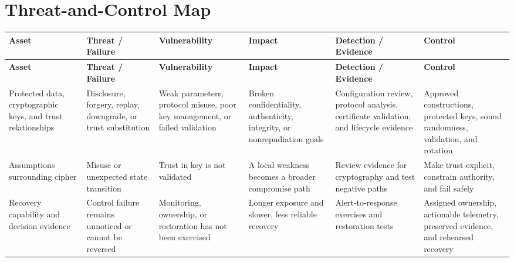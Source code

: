 \documentclass[11pt,letterpaper]{article}
\begin{document}
\section*{Threat-and-Control Map}
\begingroup\scriptsize\setlength{\tabcolsep}{2pt}
\begin{longtable}{>{\raggedright\arraybackslash}p{}>{\raggedright\arraybackslash}p{}>{\raggedright\arraybackslash}p{}>{\raggedright\arraybackslash}p{}>{\raggedright\arraybackslash}p{}>{\raggedright\arraybackslash}p{}}
\toprule\rowcolor{Navy}\color{white}\textbf{Asset} & \color{white}\textbf{Threat / Failure} & \color{white}\textbf{Vulnerability} & \color{white}\textbf{Impact} & \color{white}\textbf{Detection / Evidence} & \color{white}\textbf{Control}\\\midrule
\endfirsthead
\toprule\rowcolor{Navy}\color{white}\textbf{Asset} & \color{white}\textbf{Threat / Failure} & \color{white}\textbf{Vulnerability} & \color{white}\textbf{Impact} & \color{white}\textbf{Detection / Evidence} & \color{white}\textbf{Control}\\\midrule
\endhead
Protected data, cryptographic keys, and trust relationships & Disclosure, forgery, replay, downgrade, or trust substitution & Weak parameters, protocol misuse, poor key management, or failed validation & Broken confidentiality, authenticity, integrity, or nonrepudiation goals & Configuration review, protocol analysis, certificate validation, and lifecycle evidence & Approved constructions, protected keys, sound randomness, validation, and rotation\\\midrule
Assumptions surrounding cipher & Misuse or unexpected state transition & Trust in key is not validated & A local weakness becomes a broader compromise path & Review evidence for cryptography and test negative paths & Make trust explicit, constrain authority, and fail safely\\\midrule
Recovery capability and decision evidence & Control failure remains unnoticed or cannot be reversed & Monitoring, ownership, or restoration has not been exercised & Longer exposure and slower, less reliable recovery & Alert-to-response exercises and restoration tests & Assigned ownership, actionable telemetry, preserved evidence, and rehearsed recovery\\\midrule
\bottomrule
\end{longtable}
\endgroup
\end{document}
